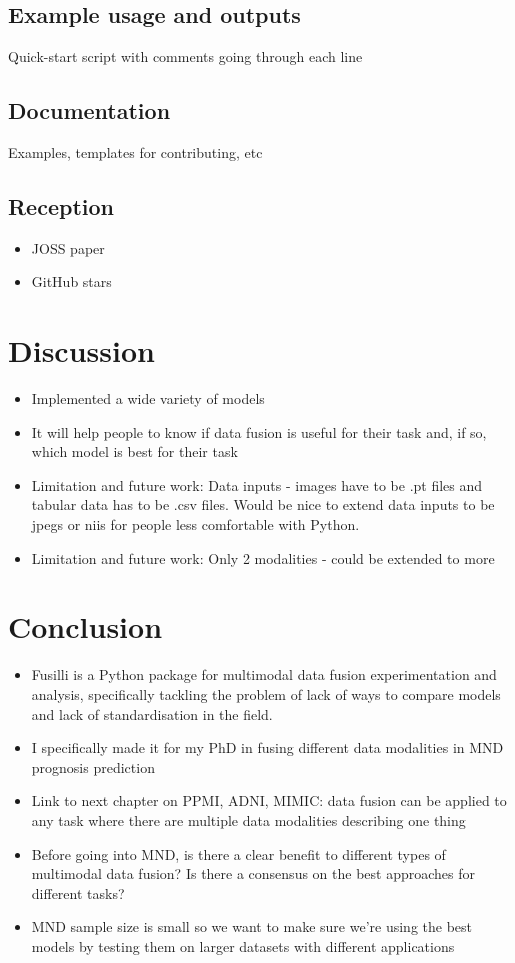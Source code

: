 \subsection{Example usage and outputs}
Quick-start script with comments going through each line

\subsection{Documentation}
Examples, templates for contributing, etc

\subsection{Reception}
\begin{itemize}
    \item JOSS paper
    \item GitHub stars
\end{itemize}

\section{Discussion}
\begin{itemize}
    \item Implemented a wide variety of models
    \item It will help people to know if data fusion is useful for their task and, if so, which model is best for their task
    \item Limitation and future work: Data inputs - images have to be .pt files and tabular data has to be .csv files. Would be nice to extend data inputs to be jpegs or niis for people less comfortable with Python.
    \item Limitation and future work: Only 2 modalities - could be extended to more
\end{itemize}

\section{Conclusion}
\begin{itemize}
    \item Fusilli is a Python package for multimodal data fusion experimentation and analysis, specifically tackling the problem of lack of ways to compare models and lack of standardisation in the field.
    \item I specifically made it for my PhD in fusing different data modalities in MND prognosis prediction
    \item Link to next chapter on PPMI, ADNI, MIMIC: data fusion can be applied to any task where there are multiple data modalities describing one thing
    \item Before going into MND, is there a clear benefit to different types of multimodal data fusion? Is there a consensus on the best approaches for different tasks?
    \item MND sample size is small so we want to make sure we're using the best models by testing them on larger datasets with different applications
\end{itemize}
